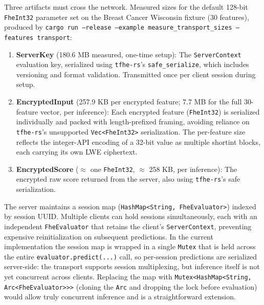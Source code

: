 \documentclass[12pt]{article}
\begin{document}
Three artifacts must cross the network. Measured sizes for the default 128-bit \texttt{FheInt32} parameter set on the Breast Cancer Wisconsin fixture (30 features), produced by \texttt{cargo run --release --example measure\_transport\_sizes --features transport}:
\begin{enumerate}
\item \textbf{ServerKey} (180.6 MB measured, one-time setup): The \texttt{ServerContext} evaluation key, serialized using \texttt{tfhe-rs}'s \texttt{safe\_serialize}, which includes versioning and format validation. Transmitted once per client session during setup.
\item \textbf{EncryptedInput} (257.9 KB per encrypted feature; 7.7 MB for the full 30-feature vector, per inference): Each encrypted feature (\texttt{FheInt32}) is serialized individually and packed with length-prefixed framing, avoiding reliance on \texttt{tfhe-rs}'s unsupported \texttt{Vec<FheInt32>} serialization. The per-feature size reflects the integer-API encoding of a 32-bit value as multiple shortint blocks, each carrying its own LWE ciphertext.
\item \textbf{EncryptedScore} ($\approx$ one \texttt{FheInt32}, $\approx$ 258 KB, per inference): The encrypted raw score returned from the server, also using \texttt{tfhe-rs}'s safe serialization.
\end{enumerate}

The server maintains a session map (\texttt{HashMap<String, FheEvaluator>}) indexed by session UUID. Multiple clients can hold sessions simultaneously, each with an independent \texttt{FheEvaluator} that retains the client's \texttt{ServerContext}, preventing expensive reinitialization on subsequent predictions. In the current implementation the session map is wrapped in a single \texttt{Mutex} that is held across the entire \texttt{evaluator.predict(...)} call, so per-session predictions are serialized server-side: the transport supports session multiplexing, but inference itself is not yet concurrent across clients. Replacing the map with \texttt{Mutex<HashMap<String, Arc<FheEvaluator>>>} (cloning the \texttt{Arc} and dropping the lock before evaluation) would allow truly concurrent inference and is a straightforward extension.
\end{document}
